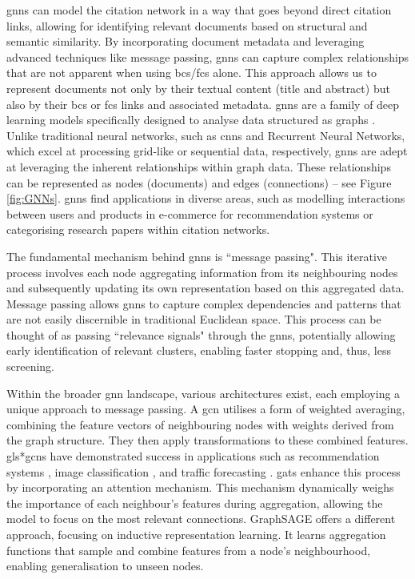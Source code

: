 \documentclass[10pt,oneside]{book}
\begin{document}
\glspl*{gnn} can model the citation network in a way that goes beyond direct citation links, allowing for identifying relevant documents based on structural and semantic similarity. By incorporating document metadata and leveraging advanced techniques like message passing, \glspl*{gnn} can capture complex relationships that are not apparent when using \gls*{bcs}/\gls*{fcs} alone. This approach allows us to represent documents not only by their textual content (title and abstract) but also by their \gls*{bcs} or \gls*{fcs} links and associated metadata. \glspl*{gnn} are a family of deep learning models specifically designed to analyse data structured as graphs \cite{lee_attention_2018, wu_comprehensive_2021, bronstein_geometric_2017, khemani_review_2024}. Unlike traditional neural networks, such as \glspl*{cnn} and Recurrent Neural Networks, which excel at processing grid-like or sequential data, respectively, \glspl*{gnn} are adept at leveraging the inherent relationships within graph data. These relationships can be represented as nodes (documents) and edges (connections) – see Figure \ref{fig:GNNs}. \glspl*{gnn} find applications in diverse areas, such as modelling interactions between users and products in e-commerce for recommendation systems or categorising research papers within citation networks. 

The fundamental mechanism behind \glspl*{gnn} is ``message passing". This iterative process involves each node aggregating information from its neighbouring nodes and subsequently updating its own representation based on this aggregated data. Message passing allows \glspl*{gnn} to capture complex dependencies and patterns that are not easily discernible in traditional Euclidean space. This process can be thought of as passing ``relevance signals" through the \glspl*{gnn}, potentially allowing early identification of relevant clusters, enabling faster stopping and, thus, less screening.

Within the broader \gls*{gnn} landscape, various architectures exist, each employing a unique approach to message passing. A \gls*{gcn} \cite{berg_graph_2017} utilises a form of weighted averaging, combining the feature vectors of neighbouring nodes with weights derived from the graph structure. They then apply transformations to these combined features. gls*{gcn}s have demonstrated success in applications such as recommendation systems \cite{fan_graph_2019}, image classification \cite{monti_geometric_2016}, and traffic forecasting \cite{cui_traffic_2020}. \glspl*{gat} enhance this process by incorporating an attention mechanism. This mechanism dynamically weighs the importance of each neighbour's features during aggregation, allowing the model to focus on the most relevant connections. GraphSAGE offers a different approach, focusing on inductive representation learning. It learns aggregation functions that sample and combine features from a node's neighbourhood, enabling generalisation to unseen nodes. 
\end{document}

